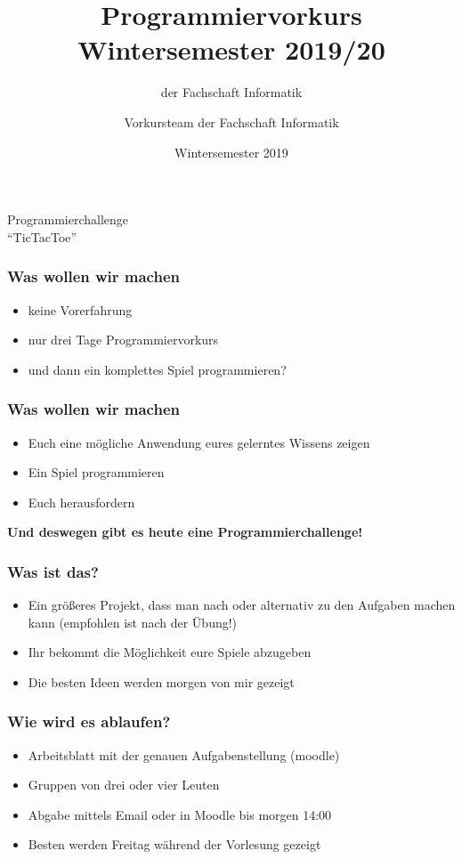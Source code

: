 \documentclass[accentcolor=tud3c,colorbacktitle,inverttitle,landscape,german,presentation,t]{tudbeamer}
\title[Programmiervorkurs]{Programmiervorkurs Wintersemester 2019/20}
\subtitle{{\small der Fachschaft Informatik}}
\author{Vorkursteam der Fachschaft Informatik}
\institute{TU Darmstadt}
\date{Wintersemester 2019}
\begin{document}
\begin{titleframe}
	\begin{center}
		\vspace{2cm}
		{\huge Programmierchallenge \\ "`TicTacToe"'}
	\end{center}
\end{titleframe}


\begin{frame}
	\frametitle{Was wollen wir machen}
		\begin{itemize}
			\item keine Vorerfahrung
			\item nur drei Tage Programmiervorkurs
			\item und dann ein komplettes Spiel programmieren?
		\end{itemize}
\end{frame}


\begin{frame}
	\frametitle{Was wollen wir machen}
		\begin{itemize}
			\item Euch eine mögliche Anwendung eures gelerntes Wissens zeigen
			\item Ein Spiel programmieren
			\item Euch herausfordern
		\end{itemize}
		\vspace{6mm}
	\begin{center}
	 \textbf{\huge Und deswegen gibt es heute eine Programmierchallenge!}	
	\end{center}
	
\end{frame}



\begin{frame}
	\frametitle{Was ist das?}
	\begin{itemize}
		\item Ein größeres Projekt, dass man nach oder alternativ zu den Aufgaben machen kann (empfohlen ist nach der Übung!)
		\item Ihr bekommt die Möglichkeit eure Spiele abzugeben
		\item Die besten Ideen werden morgen von mir gezeigt
	\end{itemize}
\end{frame}

\begin{frame}
	\frametitle{Wie wird es ablaufen?}
	\begin{itemize}
		\item Arbeitsblatt mit der genauen Aufgabenstellung (moodle)
		\item Gruppen von drei oder vier Leuten
		\item Abgabe mittels Email oder in Moodle bis morgen 14:00
		\item Besten werden Freitag während der Vorlesung gezeigt
	\end{itemize}
\end{frame}
\end{document}
